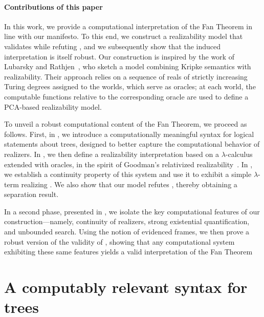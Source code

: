 \documentclass[a4paper,UKenglish,cleveref, autoref, thm-restate]{lipics-v2021}
\begin{document}
\paragraph*{Contributions of this paper}
In this work, we provide a computational interpretation of the Fan Theorem in line with our manifesto. To this end, we construct a realizability model that validates \FT while refuting \WKL, and we subsequently show that the induced interpretation is itself robust.
Our construction is inspired by the work of Lubarsky and Rathjen~\cite{LubRat13}, who sketch a model combining Kripke semantics with realizability. Their approach relies on a sequence of reals of strictly increasing Turing degrees assigned to the worlds, which serve as oracles; at each world, the computable functions relative to the corresponding oracle are used to define a PCA-based realizability model.

To unveil a robust computational content of the Fan Theorem, we proceed as follows. First, in , we introduce a computationally meaningful syntax for logical statements about trees, designed to better capture the computational behavior of realizers. In , we then define a realizability interpretation based on a $\lambda$-calculus extended with oracles, in the spirit of Goodman's relativized realizability~\cite{Goodman1978}. In , we establish a continuity property of this system and use it to exhibit a simple $\lambda$-term realizing \FT. We also show that our model refutes \WKL, thereby obtaining a separation result.

In a second phase, presented in , we isolate the key computational features of our construction—namely, continuity of realizers, strong existential quantification, and unbounded search. Using the notion of evidenced frames, we then prove a robust version of the validity of \FT, showing that any computational system exhibiting these same features yields a valid interpretation of the Fan Theorem









\newcommand{\ZFC}{ZFC}
\newcommand{\ZF}{ZF}
\newcommand{\RCAO}{RCA0}
\newcommand{\RCA}{RCA}
\newcommand{\double}{double}
\newcommand{\intt}{int}




\section{A computably relevant syntax for trees}
\label{s:HOL}
\end{document}
